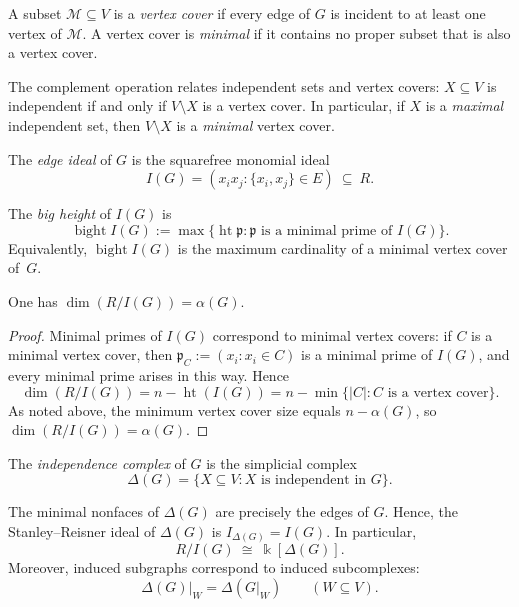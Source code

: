 \documentclass[12pt]{amsart}
\theoremstyle{plain}
\theoremstyle{definition}
\DeclareMathOperator{\bight}{bight}
\DeclareMathOperator{\height}{ht}
\begin{document}
\begin{defn}\label{def:vertex-covers}
A subset $\mathcal{M} \subseteq V$ is a \emph{vertex cover} if every edge of $G$ is incident to at least one
vertex of $\mathcal{M} $. A vertex cover is \emph{minimal} if it contains no proper subset that is also a
vertex cover.
\end{defn}

The complement operation relates independent sets and vertex covers: $X\subseteq V$ is independent
if and only if $V\setminus X$ is a vertex cover. In particular, if $X$ is a \emph{maximal}
independent set, then $V\setminus X$ is a \emph{minimal} vertex cover.

\begin{defn}\label{def:edge-ideal}
The \emph{edge ideal} of $G$ is the squarefree monomial ideal
\[
I(G)=(x_ix_j : \{x_i,x_j\}\in E)\ \subseteq\ R.
\]
\end{defn}

\begin{defn}\label{def:bight}
The \emph{big height} of $I(G)$ is
\[
\bight I(G) := \max\{\height \mathfrak p : \mathfrak p \text{ is a minimal prime of } I(G)\}.
\]
Equivalently, $\bight I(G)$ is the maximum cardinality of a minimal vertex cover of~$G$.
\end{defn}

\begin{lem}\label{lem:dim-alpha}
One has $\dim(R/I(G))=\alpha(G)$.
\end{lem}

\begin{proof}
Minimal primes of $I(G)$ correspond to minimal vertex covers: if $C$ is a minimal vertex cover,
then $\mathfrak p_C:=(x_i : x_i\in C)$ is a minimal prime of $I(G)$, and every minimal prime arises
in this way. Hence
\[
\dim(R/I(G)) = n - \height(I(G)) = n - \min\{|C| : C \text{ is a vertex cover}\}.
\]
As noted above, the minimum vertex cover size equals $n-\alpha(G)$, so $\dim(R/I(G))=\alpha(G)$.
\end{proof}

\begin{defn}\label{def:independence-complex}
The \emph{independence complex} of $G$ is the simplicial complex
\[
\Delta(G) = \{X\subseteq V : X \text{ is independent in } G\}.
\]
\end{defn}

The minimal nonfaces of $\Delta(G)$ are precisely the edges of $G$. Hence,
the Stanley--Reisner ideal
of $\Delta(G)$ is $I_{\Delta(G)}=I(G)$. In particular,
\[
R/I(G)\ \cong\ \Bbbk[\Delta(G)].
\]
Moreover, induced subgraphs correspond to induced subcomplexes:
\[
\Delta(G)|_W =  \Delta(G|_W)\qquad (W\subseteq V).
\]
\end{document}
